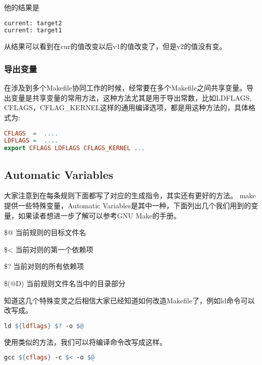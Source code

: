 他的结果是
\begin{lstlisting}[language=bash]
current: target2
current: target1
\end{lstlisting}
从结果可以看到在cur的值改变以后v1的值改变了，但是v2的值没有变。

\subsubsection{导出变量}
在涉及到多个Makefile协同工作的时候，经常要在多个Makefile之间共享变量。导出变量是共享变量的常用方法，这种方法尤其是用于导出常数，比如LDFLAGS, CFLAGS，CFLAG\_KERNEL这样的通用编译选项，都是用这种方法的，具体格式为:
\begin{lstlisting}[language=make]
CFLAGS  =  ....
LDFLAGS =  ....
export CFLAGS LDFLAGS CFLAGS_KERNEL ...
\end{lstlisting}

\subsection{Automatic Variables}
大家注意到在每条规则下面都写了对应的生成指令，其实还有更好的方法。
make提供一些特殊变量，Automatic Variables是其中一种，下面列出几个我们用到的变量，如果读者想进一步了解可以参考GNU Make的手册。
\begin{compactenum}
\item \$@    当前规则的目标文件名
\item \$<    当前对则的第一个依赖项
\item \$?    当前对则的所有依赖项
\item \$(@D) 当前规则文件名当中的目录部分
\end{compactenum}
知道这几个特殊变灵之后相信大家已经知道如何改造Makefile了，例如ld命令可以改写成。
\begin{lstlisting}[language=make]
ld ${ldflags} $? -o $@
\end{lstlisting}
使用类似的方法，我们可以将编译命令改写成这样。
\begin{lstlisting}[language=make]
gcc ${cflags} -c $< -o $@
\end{lstlisting}

